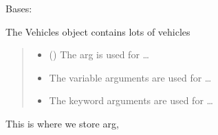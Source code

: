 \documentclass[letterpaper,10pt,english]{sphinxmanual}
\begin{document}
\begin{fulllineitems}
\label{\detokenize{_autosummary/module.dummycode.NumpyVehicle:module.dummycode.NumpyVehicle}}
\pysigstartsignatures
{}
\pysigstopsignatures
\sphinxAtStartPar
Bases: 

\sphinxAtStartPar
The Vehicles object contains lots of vehicles
\begin{quote}\begin{description}
\begin{itemize}
\item {} 
\sphinxAtStartPar
{} () \textendash{} The arg is used for …

\item {} 
\sphinxAtStartPar
{} \textendash{} The variable arguments are used for …

\item {} 
\sphinxAtStartPar
{} \textendash{} The keyword arguments are used for …

\end{itemize}

\end{description}\end{quote}

\begin{fulllineitems}
\label{\detokenize{_autosummary/module.dummycode.NumpyVehicle:module.dummycode.NumpyVehicle.arg}}
\pysigstartsignatures
{}
\pysigstopsignatures
\sphinxAtStartPar
This is where we store arg,
\begin{quote}\begin{description}
\sphinxAtStartPar
{}

\end{description}\end{quote}


\end{fulllineitems}
\end{fulllineitems}
\end{document}
